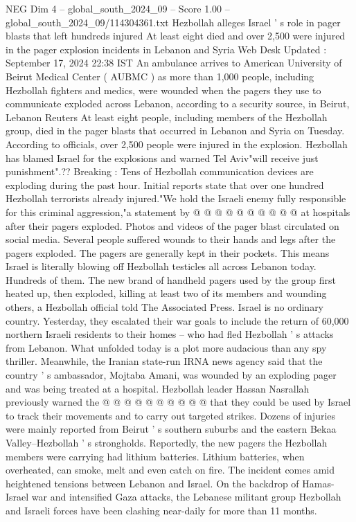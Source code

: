 \begin{textsample}{NEG Dim 4 – global\_south\_2024\_09 – Score 1.00 – global\_south\_2024\_09/114304361.txt}  \label{ex:f4_neg_166}
Hezbollah alleges Israel ' s role in pager blasts that left hundreds injured At least eight died and over 2,500 were injured in the pager explosion incidents in Lebanon and Syria Web Desk Updated : September 17, 2024 22:38 IST An ambulance arrives to American University of Beirut Medical Center ( AUBMC ) as more than 1,000 people, including Hezbollah fighters and medics, were wounded when the pagers they use to communicate exploded across Lebanon, according to a security source, in Beirut, Lebanon Reuters At least eight people, including members of the Hezbollah group, died in the pager blasts that occurred in Lebanon and Syria on Tuesday.
According to officials, over 2,500 people were injured in the explosion.
Hezbollah has blamed Israel for the explosions and warned Tel Aviv"will receive just punishment".??
Breaking : Tens of Hezbollah communication devices are exploding during the past hour.
Initial reports state that over one hundred Hezbollah terrorists already injured."We hold the Israeli enemy fully responsible for this criminal aggression,"a statement by @ @ @ @ @ @ @ @ @ @ at hospitals after their pagers exploded.
Photos and videos of the pager blast circulated on social media.
Several people suffered wounds to their hands and legs after the pagers exploded.
The pagers are generally kept in their pockets.
This means Israel is literally blowing off Hezbollah testicles all across Lebanon today.
Hundreds of them.
The new brand of handheld pagers used by the group first heated up, then exploded, killing at least two of its members and wounding others, a Hezbollah official told The Associated Press.
Israel is no ordinary country.
Yesterday, they escalated their war goals to include the return of 60,000 northern Israeli residents to their homes -- who had fled Hezbollah ' s attacks from Lebanon.
What unfolded today is a plot more audacious than any spy thriller.
Meanwhile, the Iranian state-run IRNA news agency said that the country ' s ambassador, Mojtaba Amani, was wounded by an exploding pager and was being treated at a hospital.
Hezbollah leader Hassan Nasrallah previously warned the @ @ @ @ @ @ @ @ @ @ that they could be used by Israel to track their movements and to carry out targeted strikes.
Dozens of injuries were mainly reported from Beirut ' s southern suburbs and the eastern Bekaa Valley--Hezbollah ' s strongholds.
Reportedly, the new pagers the Hezbollah members were carrying had lithium batteries.
Lithium batteries, when overheated, can smoke, melt and even catch on fire.
The incident comes amid heightened tensions between Lebanon and Israel.
On the backdrop of Hamas-Israel war and intensified Gaza attacks, the Lebanese militant group Hezbollah and Israeli forces have been clashing near-daily for more than 11 months.

\end{textsample}
